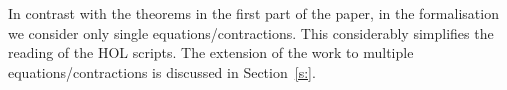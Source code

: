 In contrast with the theorems in the first part of the paper, in the
formalisation we consider only single equations/contractions. 
This considerably simplifies the  reading of the HOL scripts. 
The extension of the work to multiple equations/contractions is
discussed in Section~\ref{s:}. 




